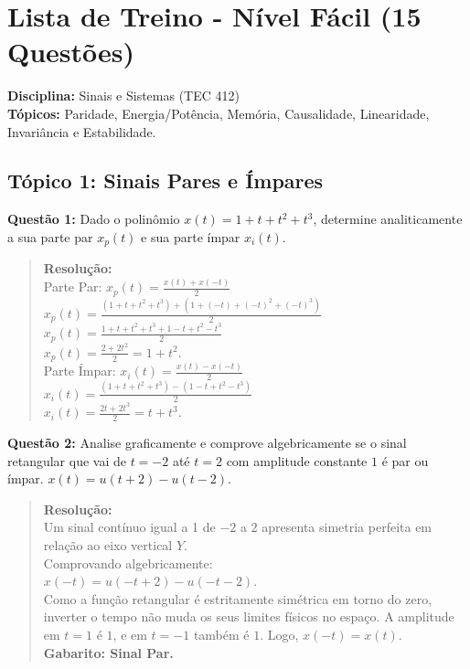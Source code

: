 \chapter{Lista de Treino - Nível Fácil (15 Questões)}

\textbf{Disciplina:} Sinais e Sistemas (TEC 412)\\
\textbf{Tópicos:} Paridade, Energia/Potência, Memória, Causalidade, Linearidade, Invariância e Estabilidade.

\section{Tópico 1: Sinais Pares e Ímpares}\label{tuxf3pico-1-sinais-pares-e-uxedmpares}

\textbf{Questão 1:} Dado o polinômio \(x(t) = 1 + t + t^2 + t^3\), determine analiticamente a sua parte par \(x_p(t)\) e sua parte ímpar \(x_i(t)\).

\begin{quote}
\textbf{Resolução:}\\
Parte Par: \(x_p(t) = \frac{x(t) + x(-t)}{2}\)\\
\(x_p(t) = \frac{(1 + t + t^2 + t^3) + (1 + (-t) + (-t)^2 + (-t)^3)}{2}\)\\
\(x_p(t) = \frac{1 + t + t^2 + t^3 + 1 - t + t^2 - t^3}{2}\)\\
\(x_p(t) = \frac{2 + 2t^2}{2} = 1 + t^2\).\\
Parte Ímpar: \(x_i(t) = \frac{x(t) - x(-t)}{2}\)\\
\(x_i(t) = \frac{(1 + t + t^2 + t^3) - (1 - t + t^2 - t^3)}{2}\)\\
\(x_i(t) = \frac{2t + 2t^3}{2} = t + t^3\).
\end{quote}

\textbf{Questão 2:} Analise graficamente e comprove algebricamente se o sinal retangular que vai de \(t=-2\) até \(t=2\) com amplitude constante \(1\) é par ou ímpar. \(x(t) = u(t+2) - u(t-2)\).

\begin{quote}
\textbf{Resolução:}\\
Um sinal contínuo igual a 1 de \(-2\) a \(2\) apresenta simetria perfeita em relação ao eixo vertical \(Y\).\\
Comprovando algebricamente:\\
\(x(-t) = u(-t+2) - u(-t-2)\).\\
Como a função retangular é estritamente simétrica em torno do zero, inverter o tempo não muda os seus limites físicos no espaço. A amplitude em \(t=1\) é \(1\), e em \(t=-1\) também é \(1\). Logo, \(x(-t) = x(t)\).\\
\textbf{Gabarito: Sinal Par.}
\end{quote}

